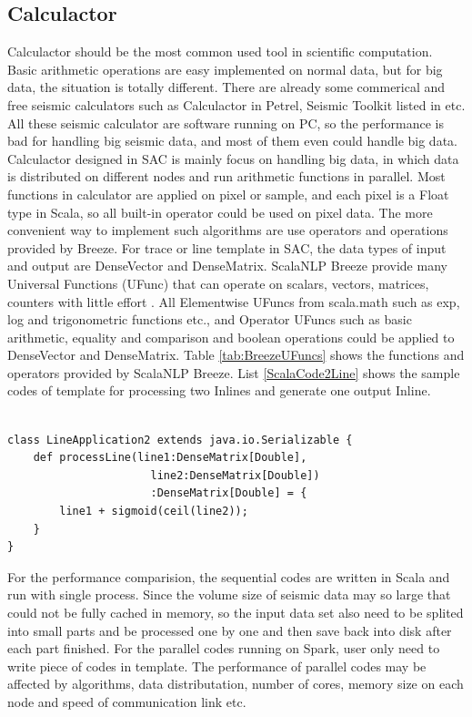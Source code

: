 \subsection{Calculactor}
Calculactor should be the most common used tool in scientific computation. Basic arithmetic operations are easy implemented on normal data, but for big data, the situation is totally different. There are already some commerical and free seismic calculators such as Calculactor in Petrel, Seismic Toolkit listed in \cite{SeismicCalculator} etc. All these seismic calculator are software running on PC, so the performance is bad for handling big seismic data, and most of them even could handle big data. Calculactor designed in SAC is mainly focus on handling big data, in which data is distributed on different nodes and run arithmetic functions in parallel. Most functions in calculator are applied on pixel or sample, and each pixel is a Float type in Scala, so all built-in operator could be used on pixel data. The more convenient way to implement such algorithms are use operators and operations provided by Breeze. For trace or line template in SAC, the data types of input and output are DenseVector and DenseMatrix. ScalaNLP Breeze provide many Universal Functions (UFunc) that can operate on scalars, vectors, matrices, counters with little effort \cite{BreezeUFunc}. All Elementwise UFuncs from scala.math such as exp, log and trigonometric functions etc., and Operator UFuncs such as basic arithmetic, equality and comparison and boolean operations could be applied to DenseVector and DenseMatrix. Table \ref{tab:BreezeUFuncs} shows the functions and operators provided by ScalaNLP Breeze. List \ref{ScalaCode2Line} shows the sample codes of template for processing two Inlines and generate one output Inline.  

\lstset{language=Java,frame=single}
\begin{lstlisting}[float,caption=Sample codes of arighmetic operations on two datasets,label=ScalaCode2Line]

class LineApplication2 extends java.io.Serializable {
    def processLine(line1:DenseMatrix[Double],
                      line2:DenseMatrix[Double])
                      :DenseMatrix[Double] = {
        line1 + sigmoid(ceil(line2)); 
    }
}
\end{lstlisting}

For the performance comparision, the sequential codes are written in Scala and run with single process. Since the volume size of seismic data may so large that could not be fully cached in memory, so the input data set also need to be splited into small parts and be processed one by one and then save back into disk after each part finished. For the parallel codes running on Spark, user only need to write piece of codes in template. The performance of parallel codes may be affected by algorithms, data distributation, number of cores, memory size on each node and speed of communication link etc. 

